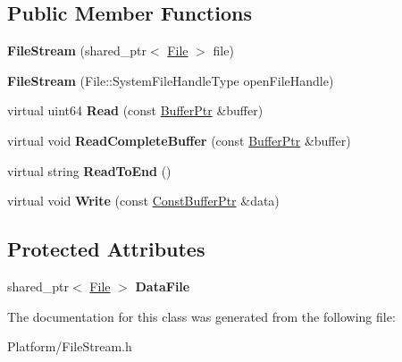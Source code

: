\subsection*{Public Member Functions}
\begin{DoxyCompactItemize}
\item 
\mbox{\label{class_gost_crypt_1_1_file_stream_ad53e0ea4840446cc2aeba26411a453f1}} 
{\bfseries File\+Stream} (shared\+\_\+ptr$<$ \hyperlink{class_gost_crypt_1_1_file}{File} $>$ file)
\item 
\mbox{\label{class_gost_crypt_1_1_file_stream_a333f095805de015cb096a348e2df66fc}} 
{\bfseries File\+Stream} (File\+::\+System\+File\+Handle\+Type open\+File\+Handle)
\item 
\mbox{\label{class_gost_crypt_1_1_file_stream_a578d5d8807a33010c5a906ba05b57c7d}} 
virtual uint64 {\bfseries Read} (const \hyperlink{class_gost_crypt_1_1_buffer_ptr}{Buffer\+Ptr} \&buffer)
\item 
\mbox{\label{class_gost_crypt_1_1_file_stream_a9a2ea6d3b4e842d11d48610f5c23e286}} 
virtual void {\bfseries Read\+Complete\+Buffer} (const \hyperlink{class_gost_crypt_1_1_buffer_ptr}{Buffer\+Ptr} \&buffer)
\item 
\mbox{\label{class_gost_crypt_1_1_file_stream_a5021190aeee53121014816a1f34dce1d}} 
virtual string {\bfseries Read\+To\+End} ()
\item 
\mbox{\label{class_gost_crypt_1_1_file_stream_a1d9caa07b6bcb08384221277905f0a55}} 
virtual void {\bfseries Write} (const \hyperlink{class_gost_crypt_1_1_const_buffer_ptr}{Const\+Buffer\+Ptr} \&data)
\end{DoxyCompactItemize}
\subsection*{Protected Attributes}
\begin{DoxyCompactItemize}
\item 
\mbox{\label{class_gost_crypt_1_1_file_stream_a88ad7f090ac28295099420b10d6250e3}} 
shared\+\_\+ptr$<$ \hyperlink{class_gost_crypt_1_1_file}{File} $>$ {\bfseries Data\+File}
\end{DoxyCompactItemize}


The documentation for this class was generated from the following file\+:\begin{DoxyCompactItemize}
\item 
Platform/File\+Stream.\+h\end{DoxyCompactItemize}
